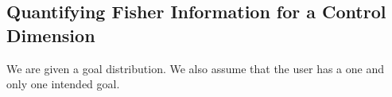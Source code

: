 \documentclass[]{article}
\begin{document}
%
%
%
%
%
%
%
%
%
\subsection*{Quantifying Fisher Information for a Control Dimension}
We are given a goal distribution. We also assume that the user has a one and only one intended goal.
\end{document}
